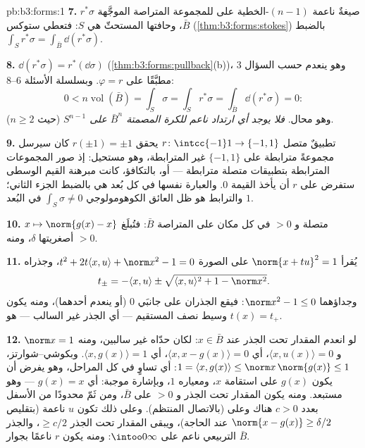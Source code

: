 \begin{solution}{pb:b3:forms:1}
\textbf{7.} $r^*\sigma$ صيغةٌ ناعمة $(n-1)$-الخطية على 
للمجموعة المتراصة الموجَّهة $\bar B$، وحافتها  المستحثّ
هي $S$: فتعطي ستوكس (\cref{thm:b3:forms:stokes}) بالضبط $\int_Sr^*\sigma = \int_{\bar B}\dd(r^*\sigma)$.

\textbf{8.} $\dd(r^*\sigma) = r^*(\dd\sigma)$ (\cref{thm:b3:forms:pullback}(b))، وهو ينعدم حسب السؤال 3
مطبَّقًا على $\varphi = r$. وبسلسلة الأسئلة 6--8:
\[
0 < n\operatorname{vol}(\bar B) = \int_S\sigma =
\int_Sr^*\sigma = \int_{\bar B}\dd(r^*\sigma) = 0 :
\]
وهو محال. \emph{فلا يوجد أي ارتداد ناعم للكرة المصمتة
$\bar B^n$ على $S^{n-1}$} (حيث $n \geq 2$).

\textbf{9.} تطبيقٌ متصل $r\colon\intcc{-1}1\to\{-1,1\}$ يحقق $r(\pm1) = \pm1$ كان
سيرسل مجموعةً مترابطة على $\{-1, 1\}$ غير المترابطة، وهو
مستحيل: إذ صور المجموعات المترابطة بتطبيقات متصلة مترابطة ---
أو، بالتكافؤ، كانت مبرهنة القيم الوسطى ستفرض على $r$ أن يأخذ
القيمة $0$. والعبارة نفسها في كل بُعد هي بالضبط الجزء الثاني؛
والترابط هو ظل العائق الكوهومولوجي $\int_S\sigma \neq 0$ في البُعد $1$.

\textbf{10.} $x \mapsto \norm{g(x) - x}$ متصلة و $> 0$ في كل مكان على المتراصة
$\bar B$: فتُبلَغ أصغريتها $\delta$، ومنه $> 0$.

\textbf{11.} يُقرأ $\norm{x + tu}^2 = 1$ على الصورة $t^2 + 2t\langle x,
u\rangle + \norm x^2 - 1 = 0$، وجذراه
\[
t_\pm = -\langle x, u\rangle \pm \sqrt{\langle x,
u\rangle^2 + 1 - \norm x^2} .
\]
وجداؤهما $\norm x^2 - 1 \leq 0$: فيقع الجذران على جانبَي $0$ (أو ينعدم
أحدهما)، ومنه يكون وسيط نصف المستقيم --- أي الجذر غير السالب
--- هو $t(x) = t_+$.

\textbf{12.} لو انعدم المقدار تحت الجذر عند $x \in \bar B$:
لكان حدّاه غير سالبين، ومنه $\norm x = 1$ و $\langle x, u(x)\rangle = 0$، أي $\langle x, x -
g(x)\rangle = 0$،
أي $\langle x, g(x)\rangle = 1$. وبكوشي--شوارتز، $1 = \langle x, g(x)\rangle \leq
\norm x\,\norm{g(x)} \leq 1$: أي تساوٍ في كل المراحل،
وهو يفرض أن يكون $g(x)$ على استقامة $x$، ومعياره $1$، وبإشارة
موجبة: أي $g(x) = x$ --- وهو مستبعد. ومنه يكون المقدار تحت
الجذر  و $> 0$ على $\bar B$، ومن ثَمّ محدودًا من الأسفل
بعدد $c > 0$ هناك وعلى  (بالاتصال المنتظم). وعلى ذلك
 تكون $u$ ناعمة (بتقليص $\norm{x - g(x)} \geq
\delta/2$ عند الحاجة)، ويبقى
المقدار تحت الجذر $\geq
c/2$، والجذر التربيعي ناعم على
$\intoo0\infty$: ومنه يكون $r$ ناعمًا بجوار $\bar B$.


\end{solution}
